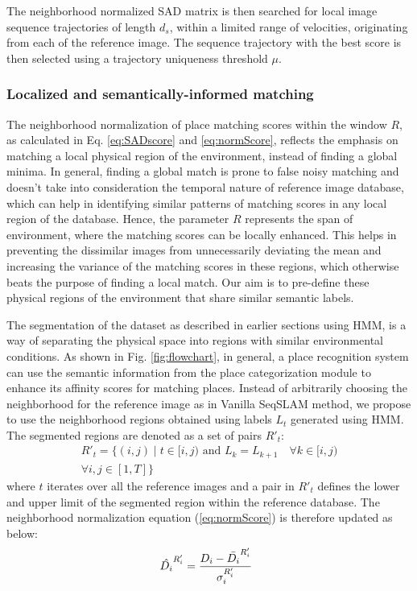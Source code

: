 \documentclass[letterpaper, 10 pt, conference]{ieeeconf}  %
\begin{document}
The neighborhood normalized SAD matrix is then searched for local image sequence trajectories of length $d_s$, within a limited range of velocities, originating from each of the reference image. The sequence trajectory with the best score is then selected using a trajectory uniqueness threshold $\mu$.

\subsubsection{Localized and semantically-informed matching}
The neighborhood normalization of place matching scores within the window $R$, as calculated in Eq. \ref{eq:SADscore} and \ref{eq:normScore}, reflects the emphasis on matching a local physical region of the environment, instead of finding a global minima. In general, finding a global match is prone to false noisy matching and doesn't take into consideration the temporal nature of reference image database, which can help in identifying similar patterns of matching scores in any local region of the database. Hence, the parameter $R$ represents the span of environment, where the matching scores can be locally enhanced. This helps in preventing the dissimilar images from unnecessarily deviating the mean and increasing the variance of the matching scores in these regions, which otherwise beats the purpose of finding a local match. Our aim is to pre-define these physical regions of the environment that share similar semantic labels. 

The segmentation of the dataset as described in earlier sections using HMM, is a way of separating the physical space into regions with similar environmental conditions. As shown in Fig. \ref{fig:flowchart}, in general, a place recognition system can use the semantic information from the place categorization module to enhance its affinity scores for matching places. Instead of arbitrarily choosing the neighborhood for the reference image as in Vanilla SeqSLAM method, we propose to use the neighborhood regions obtained using labels $L_t$ generated using HMM. The segmented regions are denoted as a set of pairs $R'_t$:
\begin{equation}
\begin{split}
 R'_t = \{ (i,j) \mid t\in [i,j) \text{ and } L_{k} = L_{k+1} \quad \forall k \in [i,j) \\
 \forall i,j \in [1,T] \}
\end{split}
\end{equation}
where $t$ iterates over all the reference images and a pair in $R'_t$ defines the lower and upper limit of the segmented region within the reference database. The neighborhood normalization equation (\ref{eq:normScore}) is therefore updated as below: 
\begin{equation}
 \hat{D_i}^{R'_i} = \frac{D_i-\bar{D_i}^{R'_i}}{\sigma_i^{R'_i}} \hspace{0.2cm}
 \label{eq:normScoreNew}
\end{equation}
\end{document}
